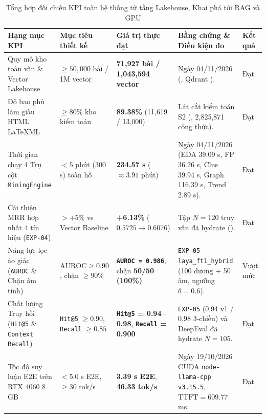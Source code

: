 \begin{table}[htbp]
  \centering
  \footnotesize
  \caption[Tổng hợp đối chiếu 7 KPI toàn hệ thống: Mục tiêu vs Thực đạt]{Tổng hợp đối chiếu KPI toàn hệ thống từ tầng Lakehouse, Khai phá tới RAG và GPU}
  \label{tab:ch5_kpi_summary}
  \vspace{4pt}
  \setlength{\tabcolsep}{2.5pt}
  \begin{tabularx}{\linewidth}{|>{\raggedright\arraybackslash}p{35mm}|>{\centering\arraybackslash}p{25mm}|>{\centering\arraybackslash}p{28mm}|L|>{\centering\arraybackslash}p{14mm}|}
    \hline
    \textbf{Hạng mục KPI} & \textbf{Mục tiêu thiết kế} & \textbf{Giá trị thực đạt} & \textbf{Bằng chứng \& Điều kiện đo} & \textbf{Kết quả} \\
    \hline
    Quy mô kho toàn văn \& Vector Lakehouse & $\ge 50,000$ bài / 1M vector & \textbf{71,927 bài / 1,043,594 vector} & Ngày 04/11/2026 (, Qdrant ). & Đạt \\
    \hline
    Độ bao phủ làm giàu HTML LaTeXML & $\ge 80\%$ kho kiểm toán & \textbf{89.38\%} (11,619 / 13,000) & Lát cắt kiểm toán S2 (, 2,825,871 công thức). & Đạt \\
    \hline
    Thời gian chạy 4 Trụ cột \texttt{MiningEngine} & $< 5$ phút (300 s) toàn hồ & \textbf{234.57 s} ($\approx 3.91$ phút) & Ngày 04/11/2026 (EDA 39.09 s, FP 36.26 s, Clus 39.94 s, Graph 116.39 s, Trend 2.89 s). & Đạt \\
    \hline
    Cải thiện $\mathrm{MRR}$ hợp nhất 4 tín hiệu (\texttt{EXP-04}) & $> +5\%$ vs Vector Baseline & \textbf{+6.13\%} ($0.5725 \rightarrow \mathbf{0.6076}$) & Tập $N=120$ truy vấn đã hydrate (). & Đạt \\
    \hline
    Năng lực lọc ảo giác (\texttt{AUROC} \& Chặn âm tính) & $\mathrm{AUROC} \ge 0.90$, chặn $\ge 90\%$ & \textbf{\texttt{AUROC = 0.986}}, chặn \textbf{50/50 (100\%)} & \texttt{EXP-05} \texttt{laya\_ft1\_hybrid} (100 dương + 50 âm, ngưỡng $\theta = 0.6$). & Vượt mức \\
    \hline
    Chất lượng Truy hồi (\texttt{Hit@5} \& \texttt{Context Recall}) & \texttt{Hit@5} $\ge 0.90$, \texttt{Recall} $\ge 0.85$ & \textbf{\texttt{Hit@5} = 0.94--0.98}, \textbf{\texttt{Recall} = 0.900} & \texttt{EXP-05} (0.94 v1 / 0.98 3-chiều) và DeepEval đã hydrate $N=105$. & Đạt \\
    \hline
    Tốc độ suy luận E2E trên RTX 4060 8 GB & $< 5.0$ s E2E, $\ge 30$ tok/s & \textbf{3.39 s E2E}, \textbf{46.33 tok/s} & Ngày 19/10/2026 CUDA \texttt{node-llama-cpp v3.15.5}, $\mathrm{TTFT} = 609.77$ ms. & Đạt \\
    \hline
  \end{tabularx}
\end{table}

